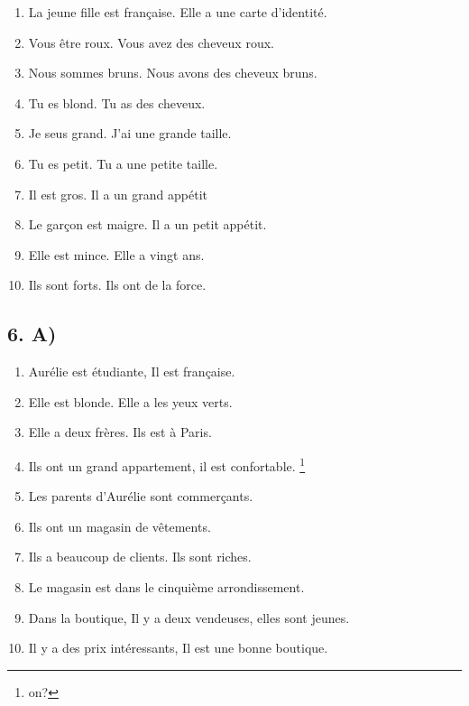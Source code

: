 \begin{enumerate}
    \item La jeune fille est française. Elle a une carte d'identité.
    \item Vous être roux. Vous avez des cheveux roux.
    \item Nous sommes bruns. Nous avons des cheveux bruns.
    \item Tu es blond. Tu as des cheveux.
    \item Je seus grand. J'ai une grande taille.
    \item Tu es petit. Tu a une petite taille.
    \item Il est gros. Il a un grand appétit
    \item Le garçon est maigre. Il a un petit appétit.
    \item Elle est mince. Elle a vingt ans.
    \item Ils sont forts. Ils ont de la force.
\end{enumerate}

\subsection*{6. A)}

\begin{enumerate}
    \item Aurélie est étudiante, Il est française.
    \item Elle est blonde. Elle a les yeux verts.
    \item Elle a deux frères. Ils est à Paris.
    \item Ils ont un grand appartement, il est confortable. \footnote{on?}
    \item Les parents d'Aurélie sont commerçants.
    \item Ils ont un magasin de vêtements.
    \item Ils a beaucoup de clients. Ils sont riches.
    \item Le magasin est dans le cinquième arrondissement.
    \item Dans la boutique, Il y a deux vendeuses, elles sont jeunes.
    \item Il y a des prix intéressants, Il est une bonne boutique.
\end{enumerate}